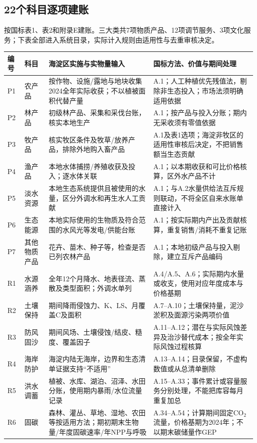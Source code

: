 \documentclass[12pt,a4paper,fontset=fandol]{ctexart}
\begin{document}
\subsection{22个科目逐项建账}
按国标表1、表2和附录E建账。三大类共7项物质产品、12项调节服务、3项文化服务；下表全部进入系统目录，实际计入规则由适用性与去重审核决定。
{\small
\begin{longtable}{P{0.8cm}P{1.7cm}P{5.6cm}P{4.9cm}}
\toprule 编号 & 科目 & 海淀区实施与实物量输入 & 国标方法、价值与期间处理 \\\midrule\endhead
P1 & 农产品 & 按作物、设施/露地与地块收集2024全年实际收获；不以植被面积代替产量 & A.1；人工种植优先残值法，剔除非生态投入；市场法须明确适用依据 \\
P2 & 林产品 & 初级林产品、采集和采伐台账，核实本地生产 & A.1；按产品与投入分账；期内无采收须有零值依据 \\
P3 & 牧产品 & 核实牧区条件及牧草/放养产品，排除外地购入畜产品 & A.1及表1选项；海淀非牧区的适用性审核后决定，不把销售额当生态贡献 \\
P4 & 渔产品 & 本地水体捕捞/养殖收获及投入；逐水体关联 & A.1；以本期收获和可比价格核算，区外水产品不计 \\
P5 & 淡水资源 & 本地生态系统提供且被使用的水量，区分外调水和再生水人工贡献 & A.1；与A.2水量供给法互斥规则联动，不将全区自来水账单直接计入 \\
P6 & 生态能源 & 本地实际使用的生物质及符合范围的水风光等发电/供能台账 & A.1；按实际期内产出及贡献核算，重复销售/消耗不重复记账 \\
P7 & 其他物质产品 & 花卉、苗木、种子等，检查是否已列农林产品 & A.1；本地初级产品与投入剔除，建立互斥产品编码 \\
R1 & 水源涵养 & 全年12个月降水、地表径流、蒸散及类型面积；外调水单列 & A.4/A.5、A.6；实际期内水量或收支，使用对应年度成本与价格基期 \\
R2 & 土壤保持 & 期间降雨侵蚀力、K、LS、月覆盖C及面积 & A.7--A.10；土壤保持量，泥沙淤积及面源污染两项价值 \\
R3 & 防风固沙 & 期间风场、土壤侵蚀/结皮、糙度、覆盖因子 & A.11--A.12；潜在与实际风蚀差异及治沙替代成本；按全年实际风蚀过程核算 \\
R4 & 海岸防护 & 海淀内陆无海岸，边界和生态清单证据支持“不适用” & A.13--A.14；目录保留，不虚构数值或从总清单删除 \\
R5 & 洪水调蓄 & 植被、水库、湖泊、沼泽、水田分账，使用期内暴雨/水位流量记录 & A.15--A.33；事件累计或容量服务分别处理，不能把库容每月重复加总 \\
R6 & 固碳 & 森林、灌丛、草地、湿地、农田等按适用方法；期初期末生物量/年度固碳速率/年NPP与呼吸 & A.34--A.54；计算期间固定CO$_2$流量，价格基期为2024年；不以期末碳储量作GEP \\

\end{longtable}}
\end{document}
